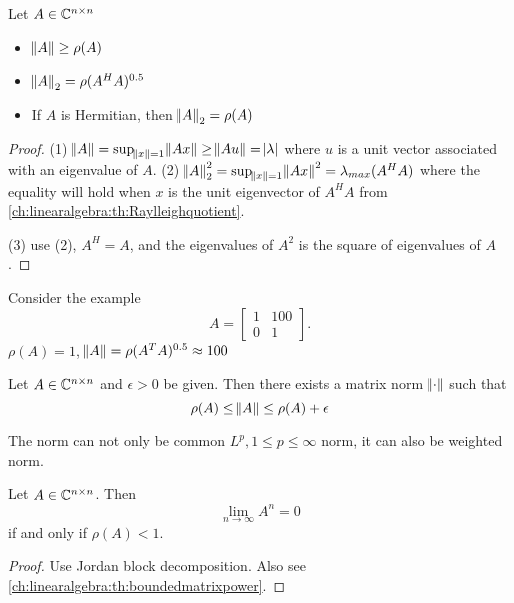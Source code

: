 \begin{refsection}
\begin{theorem}\label{ch:linearalgebra:th:spectralradiusandmatrixnorm}
	Let $A\in \mathbb{C}^{n\times n}$
	\begin{itemize}
		\item $\norm{A} \geq \rho(A)$
		\item $\norm{A}_2 = \rho(A^HA)^{0.5}$
		\item If $A$ is Hermitian, then $\norm{A}_2 = \rho(A)$
	\end{itemize}
\end{theorem}
\begin{proof}
	(1) $\norm{A} = \sup_{\norm{x}=1}\norm{Ax} \geq \norm{Au} = \abs{\lambda}$
	where $u$ is a unit vector associated with an eigenvalue of $A$. 
	(2) $\norm{A}_2^2 = \sup_{\norm{x}=1}\norm{Ax}^2 = \lambda_{max}(A^HA)$ where the equality will hold when $x$ is the unit eigenvector of $A^HA$ from \autoref{ch:linearalgebra:th:Raylleighquotient}.
	
	(3) use (2), $A^H=A$, and the eigenvalues of $A^2$ is the square of eigenvalues of $A$. 
\end{proof}

\begin{example}
	Consider the example 
	$$A = \begin{bmatrix}
	1 &100\\
	0 & 1
	\end{bmatrix}.$$
	$\rho(A) = 1$, $\norm{A} = \rho(A^TA)^{0.5} \approx 100 $
\end{example}

\begin{theorem}\cite[347]{horn2012matrix}\label{ch:linearalgebra:th:existencematrixnormclosetospectralradius}
Let $A\in \mathbb{C}^{n\times n}$ and $\epsilon >0$ be given. Then there exists a matrix norm $\norm{\cdot}$ such that 
$$\rho(A) \leq \norm{A} \leq \rho(A) + \epsilon$$ 	
\end{theorem}

\begin{remark}
The norm can not only be common $L^p, 1\leq p \leq \infty$ norm, it can also be weighted norm.
\end{remark}

\begin{theorem}[convergence]\label{ch:linearalgebra:th:convergenceofmatrixpower}
	Let $A\in \mathbb{C}^{n\times n}$. Then
	$$\lim_{n\to \infty} A^n = 0$$
	if and only if $\rho(A) < 1$. 
\end{theorem}
\begin{proof}
	Use Jordan block decomposition. Also see \autoref{ch:linearalgebra:th:boundedmatrixpower}.
\end{proof}






\end{refsection}
